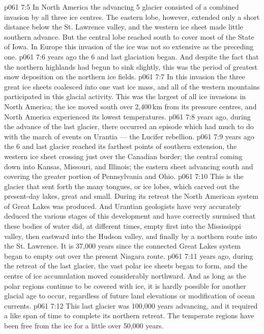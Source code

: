 \vs p061 7:5 In North America the advancing 5 glacier consisted of a combined invasion by all three ice centres. The eastern lobe, however, extended only a short distance below the St. Lawrence valley, and the western ice sheet made little southern advance. But the central lobe reached south to cover most of the State of Iowa. In Europe this invasion of the ice was not so extensive as the preceding one.
\vs p061 7:6 \pc {} years ago the 6 and last glaciation began. And despite the fact that the northern highlands had begun to sink slightly, this was the period of greatest snow deposition on the northern ice fields.
\vs p061 7:7 In this invasion the three great ice sheets coalesced into one vast ice mass, and all of the western mountains participated in this glacial activity. This was the largest of all ice invasions in North America; the ice moved south over 2,400\,km from its pressure centres, and North America experienced its lowest temperatures.
\vs p061 7:8 \pc {} years ago, during the advance of the last glacier, there occurred an episode which had much to do with the march of events on Urantia --- the Lucifer rebellion.
\vs p061 7:9 \pc {} years ago the 6 and last glacier reached its farthest points of southern extension, the western ice sheet crossing just over the Canadian border; the central coming down into Kansas, Missouri, and Illinois; the eastern sheet advancing south and covering the greater portion of Pennsylvania and Ohio.
\vs p061 7:10 This is the glacier that sent forth the many tongues, or ice lobes, which carved out the present\hyp{}day lakes, great and small. During its retreat the North American system of Great Lakes was produced. And Urantian geologists have very accurately deduced the various stages of this development and have correctly surmised that these bodies of water did, at different times, empty first into the Mississippi valley, then eastward into the Hudson valley, and finally by a northern route into the St. Lawrence. It is 37,000 years since the connected Great Lakes system began to empty out over the present Niagara route.
\vs p061 7:11 \pc {} years ago, during the retreat of the last glacier, the vast polar ice sheets began to form, and the centre of ice accumulation moved considerably northward. And as long as the polar regions continue to be covered with ice, it is hardly possible for another glacial age to occur, regardless of future land elevations or modification of ocean currents.
\vs p061 7:12 This last glacier was 100,000 years advancing, and it required a like span of time to complete its northern retreat. The temperate regions have been free from the ice for a little over 50,000 years.
